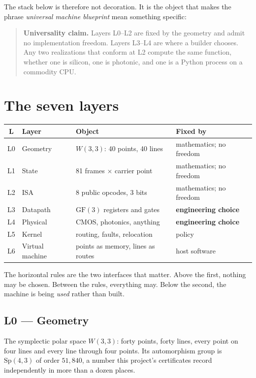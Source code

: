 The stack below is therefore not decoration. It is the object that makes the phrase
\emph{universal machine blueprint} mean something specific:

\begin{quote}
\textbf{Universality claim.} Layers L0--L2 are fixed by the geometry and admit no
implementation freedom. Layers L3--L4 are where a builder chooses. Any two realizations
that conform at L2 compute the same function, whether one is silicon, one is photonic, and
one is a Python process on a commodity CPU.
\end{quote}

\section{The seven layers}

\begin{center}
\small
\begin{tabular}{@{}c l l l@{}}
\toprule
\textbf{L} & \textbf{Layer} & \textbf{Object} & \textbf{Fixed by} \\
\midrule
L0 & Geometry   & $W(3,3)$: 40 points, 40 lines & mathematics; no freedom \\
L1 & State      & 81 frames $\times$ carrier point & mathematics; no freedom \\
L2 & ISA        & 8 public opcodes, 3 bits & mathematics; no freedom \\
\midrule
L3 & Datapath   & $\mathrm{GF}(3)$ registers and gates & \textbf{engineering choice} \\
L4 & Physical   & CMOS, photonics, anything & \textbf{engineering choice} \\
\midrule
L5 & Kernel     & routing, faults, relocation & policy \\
L6 & Virtual machine & points as memory, lines as routes & host software \\
\bottomrule
\end{tabular}
\end{center}

\noindent The horizontal rules are the two interfaces that matter. Above the first, nothing
may be chosen. Between the rules, everything may. Below the second, the machine is being
\emph{used} rather than built.

\subsection{L0 --- Geometry}

The symplectic polar space $W(3,3)$: forty points, forty lines, every point on four lines
and every line through four points. Its automorphism group is $\mathrm{Sp}(4,3)$ of order
$51{,}840$, a number this project's certificates record independently in more than a dozen
places.


